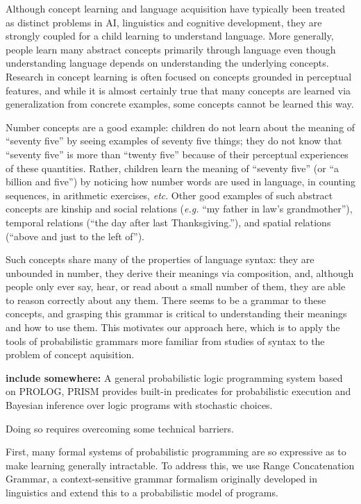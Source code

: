 \documentclass{article} %
\begin{document}
Although concept learning and language acquisition have typically been
treated as distinct problems in AI, linguistics and cognitive
development, they are strongly coupled for a child learning to
understand language. More generally, people learn many abstract
concepts primarily through language even though understanding language
depends on understanding the underlying concepts. Research in concept
learning is often focused on concepts grounded in perceptual features,
and while it is almost certainly true that many concepts are learned
via generalization from concrete examples, some concepts cannot be
learned this way.

Number concepts are a good example: children do not learn about the
meaning of ``seventy five'' by seeing examples of seventy five things;
they do not know that ``seventy five'' is more than ``twenty five''
because of their perceptual experiences of these quantities. Rather,
children learn the meaning of ``seventy five'' (or ``a billion and
five'') by noticing how number words are used in language, in counting
sequences, in arithmetic exercises, {\it etc}. Other good examples of such
abstract concepts are kinship and social relations ({\it e.g.} ``my father
in law's grandmother''), temporal relations (``the day after last
Thanksgiving.''), and spatial relations (``above and just to the left
of'').

Such concepts share many of the properties of language syntax: they
are unbounded in number, they derive their meanings via composition,
and, although people only ever say, hear, or read about a small number
of them, they are able to reason correctly about any them. There seems
to be a grammar to these concepts, and grasping this grammar is
critical to understanding their meanings and how to use them. This
motivates our approach here, which is to apply the tools of
probabilistic grammars more familiar from studies of syntax to the
problem of concept aquisition.

{\bf include somewhere:} A general probabilistic logic
programming system based on PROLOG, PRISM provides built-in predicates
for probabilistic execution and Bayesian inference over logic programs
with stochastic choices.

Doing so requires overcoming some technical barriers.

First, many formal systems of probabilistic programming are so
expressive as to make learning generally intractable. To address this,
we use Range Concatenation Grammar, a context-sensitive grammar
formalism originally developed in linguistics and extend this to a
probabilistic model of programs.
\end{document}
